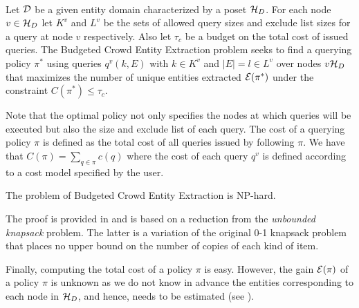 \begin{problem} \ \\
Let $\mathcal{D}$ be a given entity domain characterized by a poset $\mathcal{H}_D$. For each node $v \in \mathcal{H}_D$ let $K^v$ and $L^v$ be the sets of allowed query sizes and exclude list sizes for a query at node $v$ respectively. Also let $\tau_c$ be a budget on the total cost of issued queries. The Budgeted Crowd Entity Extraction problem seeks to find a querying policy $\pi^*$ using queries $q^v(k,E)$ with $k \in K^v$ and $|E| = l \in L^v$ over nodes $v \mathcal{H}_D$ that maximizes the number of unique entities extracted $\mathcal{E}(\pi^*)$ under the constraint $C(\pi^*) \leq \tau_c$.
\end{problem}
Note that the optimal policy not only specifies the nodes at which queries will be executed but also the size and exclude list of each query. The cost of a querying policy $\pi$ is defined as the total cost of all queries issued by following $\pi$. We have that $C(\pi) = \sum_{q \in \pi} c(q)$ where the cost of each query $q^v$ is defined according to a cost model specified by the user. 

\begin{theorem}
The problem of Budgeted Crowd Entity Extraction is NP-hard.
\end{theorem}
The proof is provided in  and is based on a reduction from the {\em unbounded knapsack} problem. The latter is a variation of the original 0-1 knapsack problem that places no upper bound on the number of copies of each kind of item.

Finally, computing the total cost of a policy $\pi$ is easy. However, the gain $\mathcal{E}(\pi)$ of a policy $\pi$ is unknown as we do not know in advance the entities corresponding to each node in $\mathcal{H}_D$, and hence, needs to be estimated (see ). 

